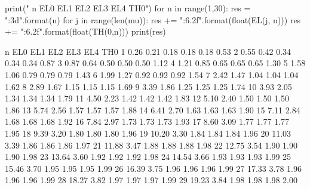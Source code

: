 
print("  n   EL0   EL1   EL2  EL3   EL4   TH0")
for n in range(1,30):
    res = "{:3d}".format(n)
    for j in range(len(mu)):
        res += "{:6.2f}".format(float(EL(j, n)))
    res += "{:6.2f}".format(float(TH(0,n)))
    print(res)

  n   EL0   EL1   EL2  EL3   EL4   TH0
  1  0.26  0.21  0.18  0.18  0.18  0.53
  2  0.55  0.42  0.34  0.34  0.34  0.87
  3  0.87  0.64  0.50  0.50  0.50  1.12
  4  1.21  0.85  0.65  0.65  0.65  1.30
  5  1.58  1.06  0.79  0.79  0.79  1.43
  6  1.99  1.27  0.92  0.92  0.92  1.54
  7  2.42  1.47  1.04  1.04  1.04  1.62
  8  2.89  1.67  1.15  1.15  1.15  1.69
  9  3.39  1.86  1.25  1.25  1.25  1.74
 10  3.93  2.05  1.34  1.34  1.34  1.79
 11  4.50  2.23  1.42  1.42  1.42  1.83
 12  5.10  2.40  1.50  1.50  1.50  1.86
 13  5.74  2.56  1.57  1.57  1.57  1.88
 14  6.41  2.70  1.63  1.63  1.63  1.90
 15  7.11  2.84  1.68  1.68  1.68  1.92
 16  7.84  2.97  1.73  1.73  1.73  1.93
 17  8.60  3.09  1.77  1.77  1.77  1.95
 18  9.39  3.20  1.80  1.80  1.80  1.96
 19 10.20  3.30  1.84  1.84  1.84  1.96
 20 11.03  3.39  1.86  1.86  1.86  1.97
 21 11.88  3.47  1.88  1.88  1.88  1.98
 22 12.75  3.54  1.90  1.90  1.90  1.98
 23 13.64  3.60  1.92  1.92  1.92  1.98
 24 14.54  3.66  1.93  1.93  1.93  1.99
 25 15.46  3.70  1.95  1.95  1.95  1.99
 26 16.39  3.75  1.96  1.96  1.96  1.99
 27 17.33  3.78  1.96  1.96  1.96  1.99
 28 18.27  3.82  1.97  1.97  1.97  1.99
 29 19.23  3.84  1.98  1.98  1.98  2.00

